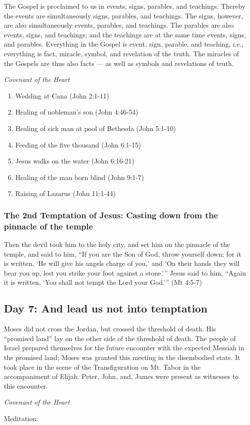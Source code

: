 \begin{quotationx}
The Gospel is proclaimed to us in events, signs, parables, and teachings. Thereby the events are simultaneously signs,
parables, and teachings. The signs, however, are also simultaneously events, parables, and teachings. The parables are
also events, signs, and teachings; and the teachings are at the same time events, signs, and parables. Everything in
the Gospel is event, sign, parable, and teaching, i.e., everything is fact, miracle, symbol, and revelation of the
truth. The miracles of the Gospels are thus also facts — as well as symbols and revelations of
truth.
\begin{flushright}\textit{Covenant of the Heart}\end{flushright}

\end{quotationx}
\begin{enumerate}
\item Wedding at Cana (John 2:1-11) 
\item Healing of nobleman's son (John 4:46-54) 
\item Healing of sick man at pool of Bethesda (John 5:1-10) 
\item Feeding of the five thousand (John 6:1-15) 
\item Jesus walks on the water (John 6:16-21) 
\item Healing of the man born blind (John 9:1-7) 
\item Raising of Lazarus (John 11:1-44) 
\end{enumerate}
\subsubsection*{The 2nd Temptation of Jesus: Casting down from the pinnacle of the temple}
Then the devil took him to the holy city, and set him on the pinnacle of the temple, and said to him, “If you are the
Son of God, throw yourself down; for it is written, `He will give his angels charge of
you,' and `On their hands they will bear you up, lest you strike your foot
against a stone.'” Jesus said to him, “Again it is written, `You shall not
tempt the Lord your God.'” (Mt 4:5-7)

\subsection*{Day 7: And lead us not into temptation}
\begin{quotationx}
Moses did not cross the Jordan, but crossed the threshold of death. His “promised land” lay on the other side of the
threshold of death. The people of Israel prepared themselves for the future encounter with the expected Messiah in the
promised land; Moses was granted this meeting in the disembodied state. It took place in the scene of the
Transfiguration on Mt. Tabor in the accompaniment of Elijah. Peter, John, and, James were present as witnesses to this
encounter. 

\begin{flushright}\textit{Covenant of the Heart}\end{flushright}

\end{quotationx}
Meditation:

